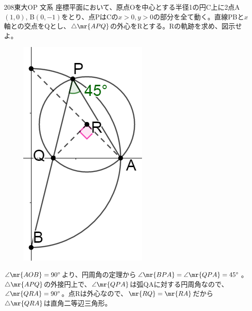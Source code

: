 \begin{thm}{208}{}{東大OP 文系}
 座標平面において、原点Oを中心とする半径1の円C上に2点A$(1,0)$, B$(0,-1)$をとり、点PはCの$x>0, y>0$の部分を全て動く。直線PBと$x$軸との交点をQとし、$\triangle\mr{APQ}$の外心をRとする。Rの軌跡を求め、図示せよ。
\end{thm}

\begin{figure}
 \includegraphics[width=\linewidth]{../problems/Q_208/A_208.png}
\end{figure}
$\angle\mr{AOB}=90^\circ$より、円周角の定理から$\angle\mr{BPA}=\angle\mr{QPA}=45^\circ$。$\triangle\mr{APQ}$の外接円上で、$\angle\mr{QPA}$は弧QAに対する円周角なので、$\angle\mr{QRA}=90^\circ$。点Rは外心なので、$\mr{RQ}=\mr{RA}$だから$\triangle\mr{QRA}$は直角二等辺三角形。

